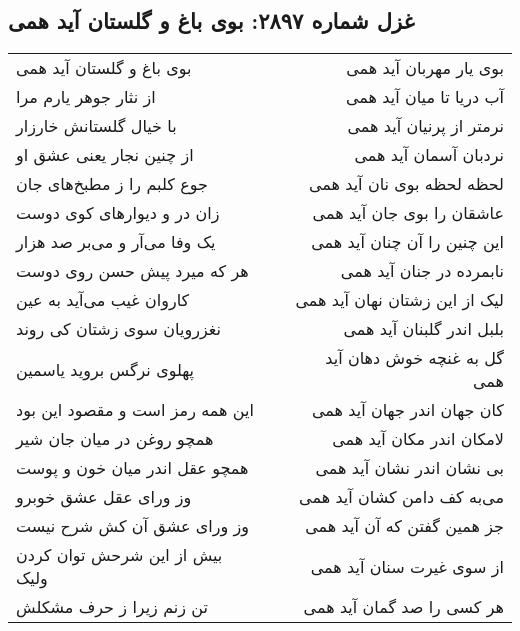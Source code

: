 \begin{center}
\section*{غزل شماره ۲۸۹۷: بوی باغ و گلستان آید همی}
\label{sec:2897}
\begin{longtable}{l p{0.5cm} r}
بوی باغ و گلستان آید همی
&&
بوی یار مهربان آید همی
\\
از نثار جوهر یارم مرا
&&
آب دریا تا میان آید همی
\\
با خیال گلستانش خارزار
&&
نرمتر از پرنیان آید همی
\\
از چنین نجار یعنی عشق او
&&
نردبان آسمان آید همی
\\
جوع کلبم را ز مطبخ‌های جان
&&
لحظه لحظه بوی نان آید همی
\\
زان در و دیوارهای کوی دوست
&&
عاشقان را بوی جان آید همی
\\
یک وفا می‌آر و می‌بر صد هزار
&&
این چنین را آن چنان آید همی
\\
هر که میرد پیش حسن روی دوست
&&
نابمرده در جنان آید همی
\\
کاروان غیب می‌آید به عین
&&
لیک از این زشتان نهان آید همی
\\
نغزرویان سوی زشتان کی روند
&&
بلبل اندر گلبنان آید همی
\\
پهلوی نرگس بروید یاسمین
&&
گل به غنچه خوش دهان آید همی
\\
این همه رمز است و مقصود این بود
&&
کان جهان اندر جهان آید همی
\\
همچو روغن در میان جان شیر
&&
لامکان اندر مکان آید همی
\\
همچو عقل اندر میان خون و پوست
&&
بی نشان اندر نشان آید همی
\\
وز ورای عقل عشق خوبرو
&&
می‌به کف دامن کشان آید همی
\\
وز ورای عشق آن کش شرح نیست
&&
جز همین گفتن که آن آید همی
\\
بیش از این شرحش توان کردن ولیک
&&
از سوی غیرت سنان آید همی
\\
تن زنم زیرا ز حرف مشکلش
&&
هر کسی را صد گمان آید همی
\\
\end{longtable}
\end{center}
